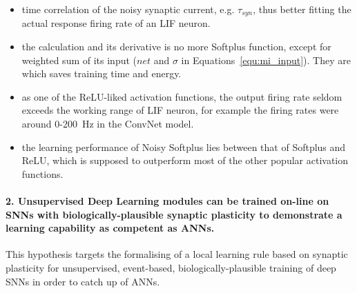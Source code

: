 	\begin{itemize}
		\item \DIFdelbegin {}\DIFdelend \DIFaddbegin {}\DIFaddend time correlation of the noisy synaptic current, e.g. $\tau_{syn}$, thus better fitting the actual response firing rate of an LIF neuron. %


		\item the calculation \DIFdelbegin {}\DIFdelend \DIFaddbegin {}\DIFaddend and its derivative is no more \DIFdelbegin {}\DIFdelend \DIFaddbegin {}\DIFaddend Softplus function, except for \DIFdelbegin {}\DIFdelend \DIFaddbegin {}\DIFaddend weighted sum of its input ($net$ and $\sigma$ in Equations~\ref{equ:mi_input}\DIFdelbegin {}\DIFdelend ).
		They are \DIFdelbegin {}\DIFdelend \DIFaddbegin {}\DIFaddend which saves training time and energy.

		\item as one of the ReLU-liked activation functions, the output firing rate seldom exceeds the working range of \DIFdelbegin {}\DIFdelend \DIFaddbegin {}\DIFaddend LIF neuron, for example the firing rates were around 0-200~Hz in the ConvNet model.

		\item the learning performance of Noisy Softplus lies between that of Softplus and ReLU, which is supposed to outperform most of the other popular activation functions.
	\end{itemize}

\paragraph{2. Unsupervised Deep Learning modules can be trained on-line on SNNs with biologically-plausible synaptic plasticity to demonstrate a learning capability as competent as ANNs.}
This hypothesis targets the formalising of a local learning rule based on synaptic plasticity for unsupervised, event-based, biologically-plausible training of deep SNNs in order to catch up \DIFdelbegin {}\DIFdelend \DIFaddbegin {}\DIFaddend of ANNs.

